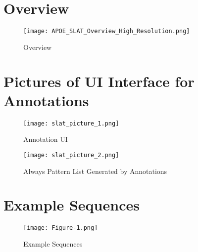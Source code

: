 \documentclass[pmlr,twocolumn,10pt]{jmlr} %
\begin{document}
\appendix

\section{Overview}
\begin{figure}[h] \label{app:overview}
\centering 
\texttt{[image: APOE\_SLAT\_Overview\_High\_Resolution.png]}
\caption{Overview}

\end{figure}

\clearpage

\section{Pictures of UI Interface for Annotations} 
\label{app:slat}
\begin{figure}[h]
\centering 
\texttt{[image: slat\_picture\_1.png]}
\caption{Annotation UI}
\end{figure}

\begin{figure}[h]
\centering 
\texttt{[image: slat\_picture\_2.png]}
\caption{Always Pattern List Generated by Annotations}
\end{figure}

\clearpage

\section{Example Sequences} 
\begin{figure}[h!] \label{app:examples}
\centering 
\texttt{[image: Figure-1.png]}
\caption{Example Sequences}
\end{figure}

\clearpage

\end{document}
